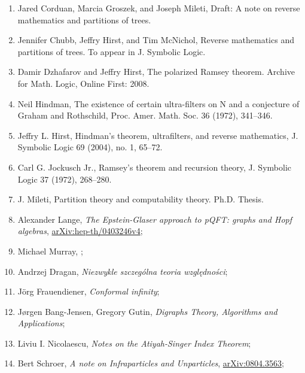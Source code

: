 \documentclass[a4paper,11pt]{article}
\begin{document}
\begin{enumerate}
\item Jared Corduan, Marcia Groszek, and Joseph Mileti, Draft: A note
  on reverse mathematics and partitions of trees.

\item Jennifer Chubb, Jeffry Hirst, and Tim McNichol, Reverse
  mathematics and partitions of trees. To appear in J. Symbolic Logic.

\item Damir Dzhafarov and Jeffry Hirst, The polarized Ramsey theorem.
  Archive for Math. Logic, Online First: 2008.

\item Neil Hindman, The existence of certain ultra-filters on N and a
  conjecture of Graham and Rothschild, Proc. Amer. Math. Soc. 36
  (1972), 341–346.

\item Jeffry L. Hirst, Hindman’s theorem, ultrafilters, and reverse
  mathematics, J. Symbolic Logic 69 (2004), no. 1, 65–72.

\item Carl G. Jockusch Jr., Ramsey’s theorem and recursion theory, J.
  Symbolic Logic 37 (1972), 268–280.

\item J. Mileti, Partition theory and computability theory. Ph.D.
  Thesis.

\item Alexander Lange, \textit{The Epstein-Glaser approach to pQFT:
    graphs and Hopf algebras},
  \href{https://arxiv.org/abs/hep-th/0403246v4}{arXiv:hep-th/0403246v4};

\item Michael Murray, ;

\item Andrzej Dragan, \textit{Niezwykle szczególna teoria
    względności};

\item J\"{o}rg Frauendiener, \textit{Conformal infinity};

\item J\o rgen Bang-Jensen, Gregory Gutin, \textit{Digraphs Theory,
    Algorithms and Applications};

\item Liviu I. Nicolaescu, \textit{Notes on the Atiyah-Singer Index
    Theorem};

\item Bert Schroer, \textit{A note on Infraparticles and Unparticles},
  \href{https://arxiv.org/abs/0804.3563}{arXiv:0804.3563};


\end{enumerate}
\end{document}
